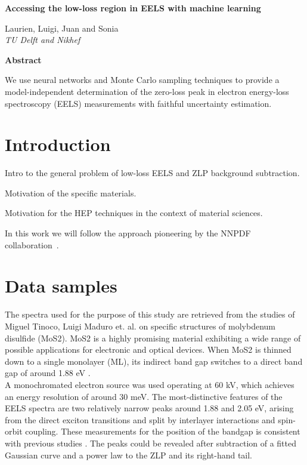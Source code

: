 \documentclass[11pt,a4paper]{article}
\numberwithin{equation}{section}
\numberwithin{figure}{section}
\numberwithin{table}{section}
\begin{document}

\vspace{2cm}

\begin{center}
  {\Large \bf
  Accessing the low-loss region in EELS with machine learning
  }
\vspace{1.4cm}


 Laurien, Luigi, Juan and Sonia\\


\vspace{0.4cm}
       {\it TU Delft and Nikhef
       }

       \vspace{1.0cm}

       {\bf \large Abstract}
       
\end{center}

We use neural networks and Monte Carlo sampling techniques
to provide a model-independent determination of the zero-loss peak
in electron energy-loss spectroscopy (EELS) measurements with faithful uncertainty estimation.

\tableofcontents

\section{Introduction}

Intro to the general problem of low-loss EELS and ZLP background subtraction.

Motivation of the specific materials.

Motivation for the HEP techniques in the context of material sciences.

In this work we will follow the approach pioneering by the NNPDF collaboration~\cite{Ball:2017nwa}.

\section{Data samples}

The spectra used for the purpose of this study are retrieved from the studies of Miguel Tinoco, Luigi Maduro et. al. \cite{soniamos2} on specific structures of molybdenum disulfide (MoS2). MoS2 is a highly promising material exhibiting a wide range of possible applications for electronic and optical devices. When MoS2 is thinned down to a single monolayer (ML), its indirect band gap switches to a direct band gap of around 1.88 eV \cite{nerl}. \\
A monochromated electron source was used operating at 60 kV, which achieves an energy resolution of around 30 meV. The most-distinctive features of the EELS spectra are two relatively narrow peaks around 1.88 and 2.05 eV, arising from the direct exciton transitions and split by interlayer interactions and spin-orbit coupling. These measurements for the position of the bandgap is consistent with previous studies \cite{nerl, komsa}. The peaks could be revealed after subtraction of a fitted Gaussian curve and a power law to the ZLP and its right-hand tail. \\
\end{document}
